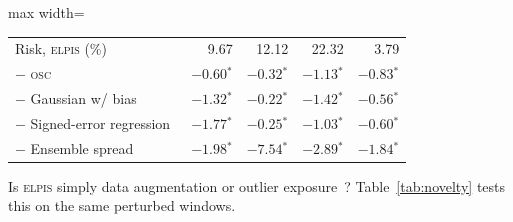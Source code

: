 \documentclass{esannV2}
\newcommand{\OSC}{\textsc{osc}}
\newcommand{\RPT}{\textsc{elpis}}
\newcommand{\s}{$^{\ast}$}
\begin{document}
\begin{table}[!htbp]
\begin{adjustbox}{max width=\textwidth}
\begin{tabular}{lrrrr}
Risk, \RPT{} (\%) & 9.67 & 12.12 & 22.32 & 3.79\\
$-$ \OSC & $-0.60$\s & $-0.32$\s & $-1.13$\s & $-0.83$\s\\
$-$ Gaussian w/ bias~\cite{nix1994estimating} & $-1.32$\s & $-0.22$\s & $-1.42$\s & $-0.56$\s\\
$-$ Signed-error regression~\cite{yoo2019learning} & $-1.77$\s & $-0.25$\s & $-1.03$\s & $-0.60$\s\\
$-$ Ensemble spread~\cite{lakshminarayanan2017simple} & $-1.98$\s & $-7.54$\s & $-2.89$\s & $-1.84$\s\\
\bottomrule
\end{tabular}\end{adjustbox}
\end{table}

Is \RPT{} simply data augmentation or outlier exposure~\cite{hendrycks2019deep}? Table~\ref{tab:novelty} tests this on the same perturbed windows.
\end{document}
